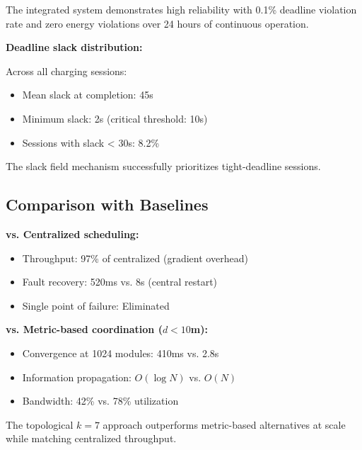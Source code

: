 The integrated system demonstrates high reliability with 0.1\% deadline violation rate and zero energy violations over 24 hours of continuous operation.

\textbf{Deadline slack distribution:}

Across all charging sessions:
\begin{itemize}
    \item Mean slack at completion: 45s
    \item Minimum slack: 2s (critical threshold: 10s)
    \item Sessions with slack < 30s: 8.2\%
\end{itemize}

The slack field mechanism successfully prioritizes tight-deadline sessions.

\subsection{Comparison with Baselines}

\textbf{vs. Centralized scheduling:}
\begin{itemize}
    \item Throughput: 97\% of centralized (gradient overhead)
    \item Fault recovery: 520ms vs. 8s (central restart)
    \item Single point of failure: Eliminated
\end{itemize}

\textbf{vs. Metric-based coordination ($d < 10$m):}
\begin{itemize}
    \item Convergence at 1024 modules: 410ms vs. 2.8s
    \item Information propagation: $O(\log N)$ vs. $O(N)$
    \item Bandwidth: 42\% vs. 78\% utilization
\end{itemize}

The topological $k=7$ approach outperforms metric-based alternatives at scale while matching centralized throughput.
